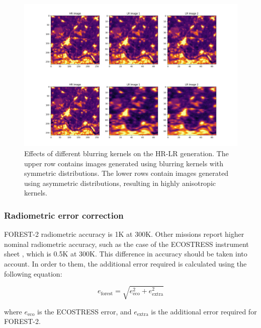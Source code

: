         \begin{figure}[H]
                \centering
                \includegraphics[width=\linewidth]{Includes/4-degradation-kernel-examples.pdf}
                \caption{Effects of different blurring kernels on the HR-LR generation. The upper row contains images generated using blurring kernels with symmetric distributions. The lower rows contain images generated using asymmetric distributions, resulting in highly anisotropic kernels.}
                \label{fig:4-degradation-kernel-examples}
            \end{figure}
            
        \subsubsection{Radiometric error correction}

        FOREST-2 radiometric accuracy is 1K at 300K.
        Other missions report higher nominal radiometric accuracy, such as the case of the ECOSTRESS instrument sheet \cite{ECOSTRESS2023INSTRUMENT}, which is 0.5K at 300K.
        This difference in accuracy should be taken into account. In order to them, the additional error required is calculated using the following equation:

        \begin{equation}
            e_{\text{forest}} = \sqrt{e_{\text{eco}}^2 + e_{\text{extra}}^2} 
            \label{eq:4-radiometric-error-correction}
        \end{equation}
        
        where $e_{\text{eco}}$ is the ECOSTRESS error, and $ e_{\text{extra}}$ is the additional error required for FOREST-2.
        
